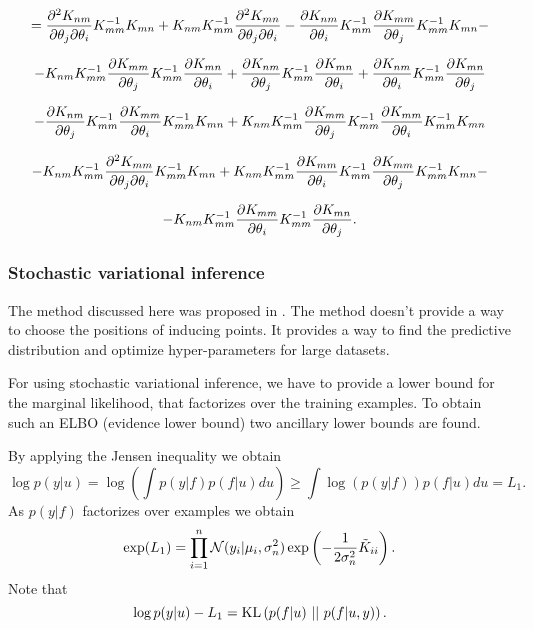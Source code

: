 \documentclass[12pt]{article}
\begin{document}
		$$ = \frac{\partial^2 K_{nm}}{\partial \theta_j \partial \theta_i}K_{mm}^{-1} K_{mn} + K_{nm} K_{mm}^{-1}\frac{\partial^2 K_{mn}}{\partial \theta_j \partial \theta_i}  - \frac{\partial K_{nm}}{\partial \theta_i}K_{mm}^{-1} \frac{\partial K_{mm}}{\partial \theta_j}K_{mm}^{-1}K_{mn} - $$
		
		$$- K_{nm} K_{mm}^{-1} \frac{\partial K_{mm}}{\partial \theta_j}K_{mm}^{-1}\frac{\partial K_{mn}}{\partial \theta_i} + \frac{\partial K_{nm}}{\partial \theta_j}K_{mm}^{-1} \frac{\partial K_{mn}}{\partial \theta_i} + \frac{\partial K_{nm}}{\partial \theta_i} K_{mm}^{-1} \frac{\partial K_{mn}}{\partial \theta_j} $$

		$$- \frac{\partial K_{nm}}{\partial \theta_j} K_{mm}^{-1} \frac{\partial K_{mm}}{\partial \theta_i}K_{mm}^{-1} K_{mn} + K_{nm} K_{mm}^{-1}\frac{\partial K_{mm}}{\partial \theta_j} K_{mm}^{-1}\frac{\partial K_{mm}}{\partial \theta_i}K_{mm}^{-1} K_{mn}$$

		$$ - K_{nm} K_{mm}^{-1} \frac{\partial^2 K_{mm}}{\partial \theta_j \partial \theta_i}K_{mm}^{-1} K_{mn} + K_{nm} K_{mm}^{-1} \frac{\partial K_{mm}}{\partial \theta_i}K_{mm}^{-1}\frac{\partial K_{mm}}{\partial \theta_j}K_{mm}^{-1} K_{mn} - $$

		$$- K_{nm} K_{mm}^{-1} \frac{\partial K_{mm}}{\partial \theta_i}K_{mm}^{-1} \frac{\partial K_{mn}}{\partial \theta_j}.$$


	\pagebreak
	\subsubsection{Stochastic variational inference}
		\label{svi}
	
		The method discussed here was proposed in \cite{BigData}. The method doesn't provide a way to choose the positions of inducing points. It provides a way to find the predictive distribution and optimize hyper-parameters for large datasets.
		
		For using stochastic variational inference, we have to provide a lower bound for the marginal likelihood, that factorizes over the training examples. To obtain such an ELBO (evidence lower bound) two ancillary lower bounds are found. 
		
		By applying the Jensen inequality we obtain
		$$ \log p(y | u) = \log \left ( \int p(y|f) p(f | u) du\right) \ge  \int \log (p(y|f)) p(f | u) du = L_1.$$	
		As $p(y | f)$ factorizes over examples we obtain
		$$\exp(L_1) = \prod_{i = 1}^{n} \mathcal{N}(y_i| \mu_i, \sigma_n^2) \exp \left( -\frac 1 {2\sigma_n^2} \tilde K_{ii}\right).$$
		Note that 
		$$\log p(y | u) - L_1 = \mbox{KL}\left(p(f | u)\mbox{ || }p(f | u, y)\right).$$
		
\end{document}
